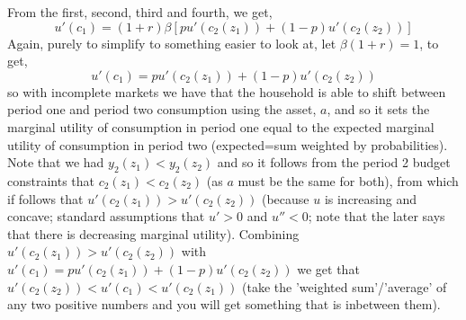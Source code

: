 From the first, second, third and fourth,  we get,
\begin{equation*}
 u'(c_1)=(1+r)\beta [ p u'(c_2(z_1)) + (1-p) u'(c_2(z_2))]
\end{equation*}
Again, purely to simplify to something easier to look at, let $\beta (1+r)=1$, to get,
\begin{equation*}
 u'(c_1)= p u'(c_2(z_1)) + (1-p) u'(c_2(z_2))
\end{equation*}
so with incomplete markets we have that the household is able to shift between period one and period two consumption using the asset, $a$, and so it sets the marginal utility of consumption in period one equal to the expected marginal utility of consumption in period two (expected=sum weighted by probabilities). Note that we had $y_2(z_1)<y_2(z_2)$ and so it follows from the period 2 budget constraints that $c_2(z_1)<c_2(z_2)$ (as $a$ must be the same for both), from which if follows that $u'(c_2(z_1))>u'(c_2(z_2))$ (because $u$ is increasing and concave; standard assumptions that $u'>0$ and $u''<0$; note that the later says that there is decreasing marginal utility). Combining $u'(c_2(z_1))>u'(c_2(z_2))$ with $u'(c_1)= p u'(c_2(z_1)) + (1-p) u'(c_2(z_2))$ we get that $u'(c_2(z_2))<u'(c_1)<u'(c_2(z_1))$ (take the 'weighted sum'/'average' of any two positive numbers and you will get something that is inbetween them).

